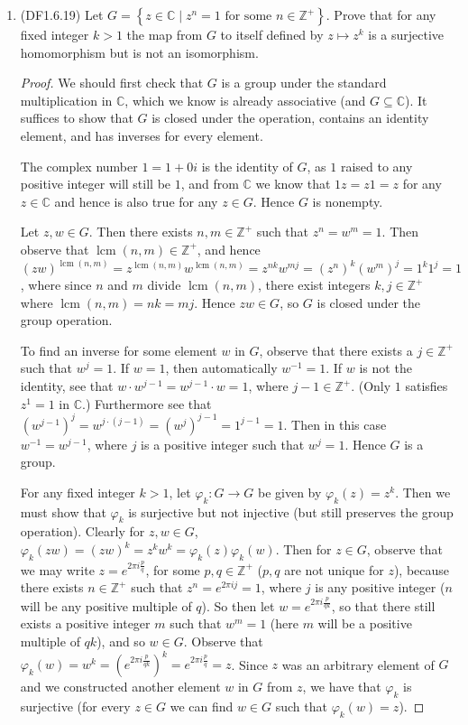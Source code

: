 \documentclass[11pt]{article}
\newcommand{\cbr}[1]{\left\{#1\right\}}
\DeclareMathOperator{\lcm}{lcm}
\begin{document}
\begin{enumerate}
    \item (DF1.6.19) Let $G = \cbr{z\in \mathbb{C}\mid z^n = 1 \text{ for some }n\in\mathbb{Z}^{+}}$. Prove that for any fixed integer $k>1$ the map from $G$ to itself defined by $z\mapsto z^k$ is a surjective homomorphism but is not an isomorphism. \begin{proof}
      We should first check that $G$ is a group under the standard multiplication in $\mathbb{C}$, which we know is already associative (and $G\subseteq \mathbb{C}$). It suffices to show that $G$ is closed under the operation, contains an identity element, and has inverses for every element.

      The complex number $1 = 1+0i$ is the identity of $G$, as $1$ raised to any positive integer will still be $1$, and from $\mathbb{C}$ we know that $1z = z1 = z$ for any $z\in\mathbb{C}$ and hence is also true for any $z\in G$. Hence $G$ is nonempty.

      Let $z,w\in G$. Then there exists $n,m\in\mathbb{Z}^{+}$ such that $z^n = w^m = 1$. Then observe that $\lcm(n,m)\in\mathbb{Z}^{+}$, and hence $(zw)^{\lcm(n,m)} = z^{\lcm(n,m)}w^{\lcm(n,m)} = z^{nk}w^{mj} = (z^n)^k(w^m)^j = 1^k1^j = 1$, where since $n$ and $m$ divide $\lcm(n,m)$, there exist integers $k,j\in\mathbb{Z}^{+}$ where $\lcm(n,m)=nk=mj$. Hence $zw\in G$, so $G$ is closed under the group operation.

      To find an inverse for some element $w$ in $G$, observe that there exists a $j\in\mathbb{Z}^{+}$ such that $w^j=1$. If $w = 1$, then automatically $w^{-1} = 1$. If $w$ is not the identity, see that $w\cdot w^{j-1} = w^{j-1}\cdot w = 1$, where $j-1\in\mathbb{Z}^{+}$. (Only $1$ satisfies $z^1 = 1$ in $\mathbb{C}$.) Furthermore see that $(w^{j-1})^j = w^{j\cdot(j-1)} = (w^j)^{j-1} = 1^{j-1} = 1$. Then in this case $w^{-1} = w^{j-1}$, where $j$ is a positive integer such that $w^j=1$. Hence $G$ is a group.

      For any fixed integer $k>1$, let $\varphi_k\colon G\to G$ be given by $\varphi_k(z) = z^k$. Then we must show that $\varphi_k$ is surjective but not injective (but still preserves the group operation). Clearly for $z,w \in G$, $\varphi_k(zw) = (zw)^k = z^kw^k = \varphi_k(z)\varphi_k(w)$. Then for $z\in G$, observe that we may write $z=e^{2\pi i\frac{p}{q}}$, for some $p,q\in\mathbb{Z}^{+}$ ($p,q$ are not unique for $z$), because there exists $n\in\mathbb{Z}^{+}$ such that $z^n = e^{2\pi ij} = 1$, where $j$ is any positive integer ($n$ will be any positive multiple of $q$). So then let $w = e^{2\pi i\frac{p}{qk}}$, so that there still exists a positive integer $m$ such that $w^m = 1$ (here $m$ will be a positive multiple of $qk$), and so $w\in G$. Observe that $\varphi_k(w) = w^k = \left(e^{2\pi i\frac{p}{qk}}\right)^k = e^{2\pi i\frac{p}{q}} = z$. Since $z$ was an arbitrary element of $G$ and we constructed another element $w$ in $G$ from $z$, we have that $\varphi_k$ is surjective (for every $z\in G$ we can find $w\in G$ such that $\varphi_k(w) = z$).


\end{proof}
\end{enumerate}
\end{document}
